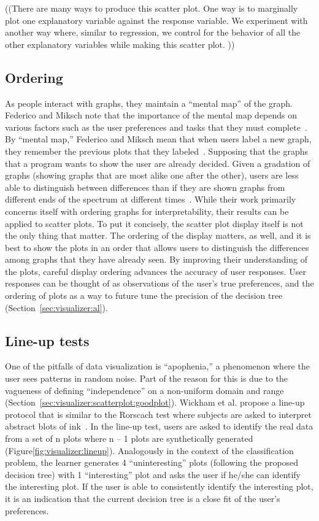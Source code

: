 ((There are many ways to produce this scatter plot. One way is to marginally plot one explanatory variable against the response variable. We experiment with another way where, similar to regression, we control for the behavior of all the other explanatory variables while making this scatter plot. ))

\subsection{Ordering}

As people interact with graphs, they maintain a ``mental map'' of the graph. Federico and Miksch note that the importance of the mental map depends on various factors such as the user preferences and tasks that they must complete~\cite{federico2016}. By ``mental map,'' Federico and Miksch mean that when users label a new graph, they remember the previous plots that they labeled~\cite{federico2016}. Supposing that the graphs that a program wants to show the user are already decided. Given a gradation of graphs (showing graphs that are most alike one after the other), users are less able to distinguish between differences than if they are shown graphs from different ends of the spectrum at different times~\cite{federico2016}. While their work primarily concerns itself with ordering graphs for interpretability, their results can be applied to scatter plots. To put it concisely, the scatter plot display itself is not the only thing that matter. The ordering of the display matters, as well, and it is best to show the plots in an order that allows users to distinguish the differences among graphs that they have already seen. By improving their understanding of the plots, careful display ordering advances the accuracy of user responses. User responses can be thought of as observations of the user’s true preferences, and the ordering of plots as a way to future tune the precision of the decision tree (Section~\ref{sec:visualizer:al}). 

\subsection{Line-up tests}

One of the pitfalls of data visualization is ``apophenia,'' a phenomenon where the user sees patterns in random noise. Part of the reason for this is due to the vagueness of defining ``independence'' on a non-uniform domain and range (Section~\ref{sec:visualizer:scatterplot:goodplot}). Wickham et al. propose a line-up protocol that is similar to the Rorscach test where subjects are asked to interpret abstract blots of ink~\cite{wickham2010}. In the line-up test, users are asked to identify the real data from a set of n plots where n – 1 plots are synthetically generated (Figure\ref{fig:visualizer:lineup}). Analogously in the context of the classification problem, the learner generates 4 ``uninteresting'' plots (following the proposed decision tree) with 1 ``interesting'' plot and asks the user if he/she can identify the interesting plot. If the user is able to consistently identify the interesting plot, it is an indication that the current decision tree is a close fit of the user’s preferences.

